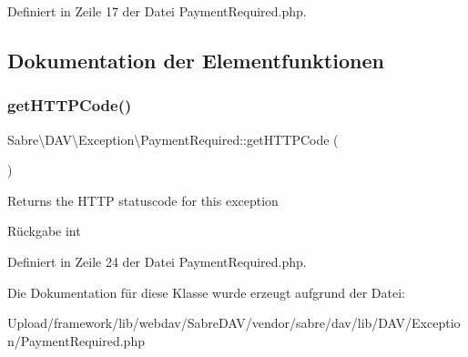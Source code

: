 Definiert in Zeile 17 der Datei Payment\+Required.\+php.



\subsection{Dokumentation der Elementfunktionen}
\mbox{\label{class_sabre_1_1_d_a_v_1_1_exception_1_1_payment_required_a6617cac062b0b11ee2680c0c0c8d654f}} 
\subsubsection{\texorpdfstring{get\+H\+T\+T\+P\+Code()}{getHTTPCode()}}
{\footnotesize\ttfamily Sabre\textbackslash{}\+D\+A\+V\textbackslash{}\+Exception\textbackslash{}\+Payment\+Required\+::get\+H\+T\+T\+P\+Code (\begin{DoxyParamCaption}{ }\end{DoxyParamCaption})}

Returns the H\+T\+TP statuscode for this exception

\begin{DoxyReturn}{Rückgabe}
int 
\end{DoxyReturn}


Definiert in Zeile 24 der Datei Payment\+Required.\+php.



Die Dokumentation für diese Klasse wurde erzeugt aufgrund der Datei\+:\begin{DoxyCompactItemize}
\item 
Upload/framework/lib/webdav/\+Sabre\+D\+A\+V/vendor/sabre/dav/lib/\+D\+A\+V/\+Exception/Payment\+Required.\+php\end{DoxyCompactItemize}
